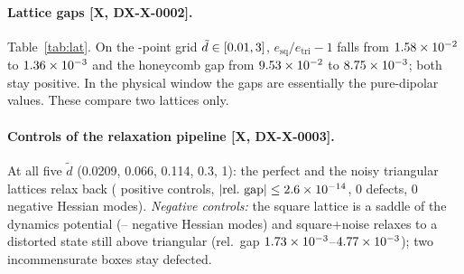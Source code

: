 \documentclass[11pt]{article}
\theoremstyle{remark}
\newcommand{\tier}[1]{\textsf{[#1]}}
\newcommand{\dt}{\tilde d}
\begin{document}
\paragraph{Lattice gaps \tier{X, DX-X-0002}.} Table~\ref{tab:lat}. On the \DXGridN-point grid
$\dt\in[\DXGridDmin,\DXGridDmax]$, $e_\mathrm{sq}/e_\mathrm{tri}-1$ falls from $1.58\times10^{-2}$ to $1.36\times10^{-3}$ and the
honeycomb gap from $9.53\times10^{-2}$ to $8.75\times10^{-3}$; both stay positive. In the physical window the gaps are essentially the
pure-dipolar values. These compare two lattices only.

\paragraph{Controls of the relaxation pipeline \tier{X, DX-X-0003}.} At all five $\dt$ (0.0209, 0.066, 0.114, 0.3, 1):
the perfect and the noisy triangular lattices relax back (\DXNPos{} positive controls, $|\text{rel.\ gap}|\le2.6\times10^{-14}$,
0 defects, 0 negative Hessian modes). \emph{Negative controls:} the square lattice is a saddle of the dynamics potential
(\DXSqNegMin--\DXSqNegMax{} negative Hessian modes) and square+noise relaxes to a distorted state still above
triangular (rel.\ gap $1.73\times10^{-3}$--$4.77\times10^{-3}$); two incommensurate boxes stay defected.
\end{document}
